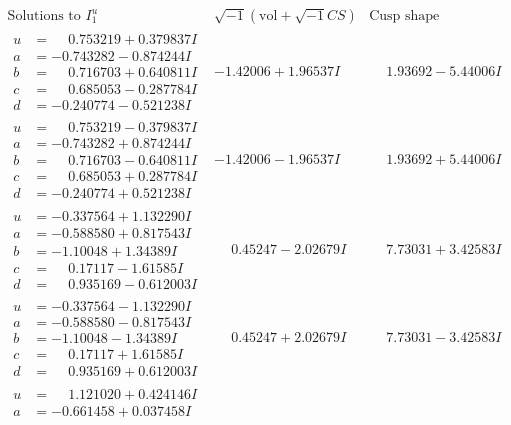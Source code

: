 \documentclass[1p]{elsarticle_modified}
\theoremstyle{definition}
\newcommand{\I}{\sqrt{-1}}
\begin{document}
$$\begin{array}{c|c|c}  
\text{Solutions to }I^u_{1}& \I (\text{vol} + \sqrt{-1}CS) & \text{Cusp shape}\\
 \hline 
\begin{aligned}
u &= \phantom{-}0.753219 + 0.379837 I \\
a &= -0.743282 - 0.874244 I \\
b &= \phantom{-}0.716703 + 0.640811 I \\
c &= \phantom{-}0.685053 - 0.287784 I \\
d &= -0.240774 - 0.521238 I\end{aligned}
 & -1.42006 + 1.96537 I & \phantom{-}1.93692 - 5.44006 I \\ \hline\begin{aligned}
u &= \phantom{-}0.753219 - 0.379837 I \\
a &= -0.743282 + 0.874244 I \\
b &= \phantom{-}0.716703 - 0.640811 I \\
c &= \phantom{-}0.685053 + 0.287784 I \\
d &= -0.240774 + 0.521238 I\end{aligned}
 & -1.42006 - 1.96537 I & \phantom{-}1.93692 + 5.44006 I \\ \hline\begin{aligned}
u &= -0.337564 + 1.132290 I \\
a &= -0.588580 + 0.817543 I \\
b &= -1.10048 + 1.34389 I \\
c &= \phantom{-}0.17117 - 1.61585 I \\
d &= \phantom{-}0.935169 - 0.612003 I\end{aligned}
 & \phantom{-}0.45247 - 2.02679 I & \phantom{-}7.73031 + 3.42583 I \\ \hline\begin{aligned}
u &= -0.337564 - 1.132290 I \\
a &= -0.588580 - 0.817543 I \\
b &= -1.10048 - 1.34389 I \\
c &= \phantom{-}0.17117 + 1.61585 I \\
d &= \phantom{-}0.935169 + 0.612003 I\end{aligned}
 & \phantom{-}0.45247 + 2.02679 I & \phantom{-}7.73031 - 3.42583 I \\ \hline\begin{aligned}
u &= \phantom{-}1.121020 + 0.424146 I \\
a &= -0.661458 + 0.037458 I \\

\end{aligned}
\end{array}$$
\end{document}
